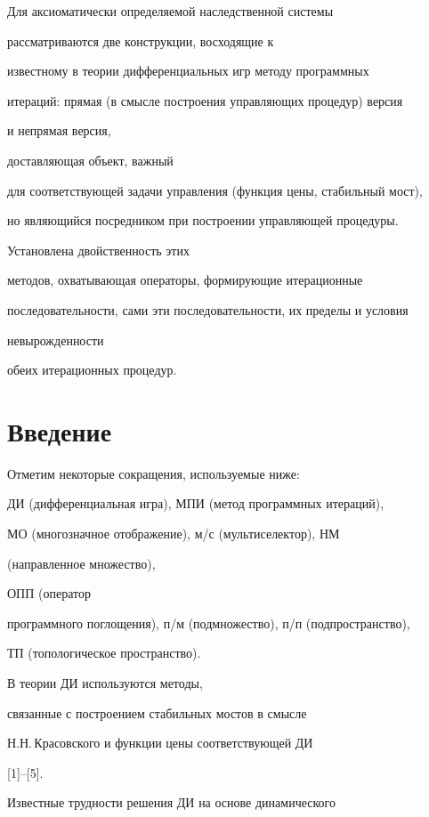 Для аксиоматически определяемой наследственной системы


рассматриваются две конструкции, восходящие к


известному в теории дифференциальных игр методу программных


итераций: прямая (в смысле построения управляющих процедур) версия


и непрямая версия,


доставляющая объект, важный


для соответствующей задачи управления (функция цены, стабильный мост),


но являющийся посредником при построении управляющей процедуры.


Установлена двойственность этих


методов, охватывающая операторы, формирующие итерационные


последовательности, сами эти последовательности, их пределы и условия


невырожденности


обеих итерационных процедур.





\section{Введение}





Отметим некоторые сокращения, используемые ниже:


ДИ (дифференциальная игра), МПИ (метод программных итераций),


МО (многозначное отображение), м/с (мультиселектор), НМ


(направленное множество),


ОПП (оператор


программного поглощения), п/м (подмножество), п/п (подпространство),


ТП (топологическое пространство).





В теории ДИ используются методы,


связанные с построением стабильных мостов в смысле


Н.Н.\,Красовского и функции цены соответствующей ДИ


[1]--[5].


Известные трудности решения ДИ на основе динамического


